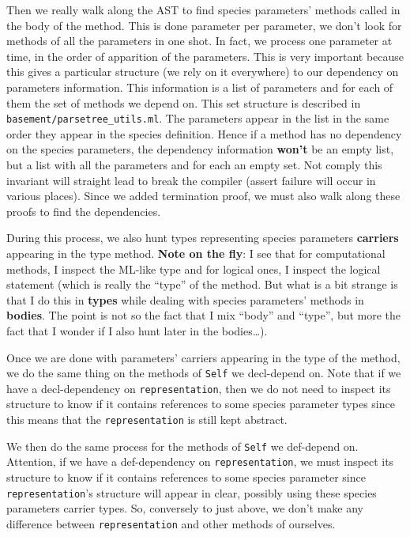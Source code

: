 Then we really walk along the AST to find species parameters' methods
called in the body of the method. This is done parameter per
parameter, we don't look for methods of all the parameters in one
shot. In fact, we process one parameter at time, in the order of
apparition of the parameters. This is very important because this
gives a particular structure (we rely on it everywhere) to our
dependency on parameters information. This information is a list of
parameters and for each of them the set of methods we depend on. This
set structure is described in {\tt basement/parsetree\_utils.ml}.
The parameters appear in the list in the same order they appear in the
species definition. Hence if a method has no dependency on the species
parameters, the dependency information {\bf won't} be an empty list,
but a list with all the parameters and for each an empty set. Not
comply this invariant will straight lead to break the compiler (assert
failure will occur in various places). Since we added termination
proof, we must also walk along these proofs to find the dependencies.

\medskip
During this process, we also hunt types representing species
parameters {\bf carriers} appearing in the type method.
{\bf Note on the fly}: I see that for computational methods, I inspect
the ML-like type and for logical ones, I inspect the logical statement
(which is really the ``type'' of the method. But what is a bit strange
is that I do this in {\bf types} while dealing with species
parameters' methods in {\bf bodies}. The point is not so the fact that
I mix ``body'' and ``type'', but more the fact that I wonder if I also
hunt later in the bodies\ldots).

\medskip
Once we are done with parameters' carriers appearing in the type of
the method, we do the same thing on the methods of {\tt Self} we
decl-depend on. Note that if we have a decl-dependency on
{\tt representation},  then we do not need to inspect its structure to
know if it contains references to some species parameter types since
this means that the {\tt representation} is still kept abstract.


\medskip
We then do the same process for the methods of {\tt Self} we
def-depend on. Attention, if we have a def-dependency on
{\tt representation}, we must inspect its structure to know if it
contains references to some species parameter since
{\tt representation}'s structure will appear in clear, possibly using
these species parameters carrier types. So, conversely to just above,
we don't make any difference between {\tt representation} and other
methods of ourselves.

